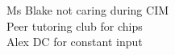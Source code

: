\documentclass[preview]{standalone}
\begin{document}
Ms Blake not caring during CIM\\Peer tutoring club for chips\\Alex DC for constant input\\
\end{document}
